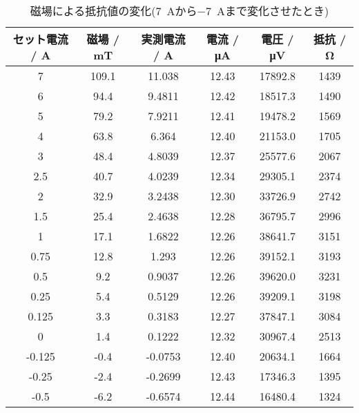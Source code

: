 \begin{table}[!ht]
	\centering
	\caption{磁場による抵抗値の変化(\SI{7}{A}から\SI{-7}{A}まで変化させたとき)}
	\label{tab:7to-7}
	\begin{tabular}{cccccc}
		\hline
		セット電流 / A & 磁場 / mT & 実測電流 / A & 電流 / \si{\micro A} & 電圧 / \si{\micro V} & 抵抗 / \si{\ohm} \\ \hline
		7         & 109.1   & 11.038   & 12.43              & 17892.8            & 1439           \\
		6         & 94.4    & 9.4811   & 12.42              & 18517.3            & 1490           \\
		5         & 79.2    & 7.9211   & 12.41              & 19478.2            & 1569           \\
		4         & 63.8    & 6.364    & 12.40              & 21153.0            & 1705           \\
		3         & 48.4    & 4.8039   & 12.37              & 25577.6            & 2067           \\
		2.5       & 40.7    & 4.0239   & 12.34              & 29305.1            & 2374           \\
		2         & 32.9    & 3.2438   & 12.30              & 33726.9            & 2742           \\
		1.5       & 25.4    & 2.4638   & 12.28              & 36795.7            & 2996           \\
		1         & 17.1    & 1.6822   & 12.26              & 38641.7            & 3151           \\
		0.75      & 12.8    & 1.293    & 12.26              & 39152.1            & 3193           \\
		0.5       & 9.2     & 0.9037   & 12.26              & 39620.0            & 3231           \\
		0.25      & 5.4     & 0.5129   & 12.26              & 39209.1            & 3198           \\
		0.125     & 3.3     & 0.3183   & 12.27              & 37847.1            & 3084           \\
		0         & 1.4     & 0.1222   & 12.32              & 30967.4            & 2513           \\
		-0.125    & -0.4    & -0.0753  & 12.40              & 20634.1            & 1664           \\
		-0.25     & -2.4    & -0.2699  & 12.43              & 17346.3            & 1395           \\
		-0.5      & -6.2    & -0.6574  & 12.44              & 16480.4            & 1324           \\

\end{tabular}
\end{table}
